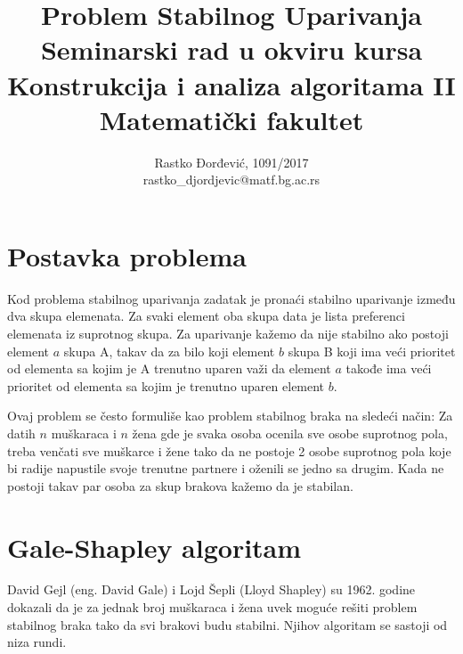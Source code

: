 \documentclass[a4paper]{article}
\begin{document}
\title{Problem Stabilnog Uparivanja\\ \small{Seminarski rad u okviru kursa\\Konstrukcija i analiza algoritama II\\ Matematički fakultet}}

\author{Rastko Đorđević, 1091/2017\\ rastko\_djordjevic@matf.bg.ac.rs}
\maketitle


\tableofcontents

\newpage



\section{Postavka problema}

Kod problema stabilnog uparivanja zadatak je pronaći stabilno uparivanje između dva skupa elemenata. Za svaki element oba skupa data je lista preferenci elemenata iz suprotnog skupa. Za uparivanje kažemo da nije stabilno ako postoji element $a$ skupa A, takav da za bilo koji element $b$ skupa B koji ima veći prioritet od elementa sa kojim je A trenutno uparen važi da element $a$ takođe ima veći prioritet od elementa sa kojim je trenutno uparen element $b$. 

Ovaj problem se često formuliše kao problem stabilnog braka na sledeći način:
Za datih $n$ muškaraca i $n$ žena gde je svaka osoba ocenila sve osobe suprotnog pola, treba venčati sve muškarce i žene tako da ne postoje 2 osobe suprotnog pola koje bi radije napustile svoje trenutne partnere i oženili se jedno sa drugim. Kada ne postoji takav par osoba za skup brakova kažemo da je stabilan.

\section{Gale-Shapley algoritam}

David Gejl (eng. David Gale) i Lojd Šepli (Lloyd Shapley) su 1962. godine dokazali da je za jednak broj muškaraca i žena uvek moguće rešiti problem stabilnog braka tako da svi brakovi budu stabilni\cite{galeShapley}. Njihov algoritam se sastoji od niza rundi.
\end{document}
